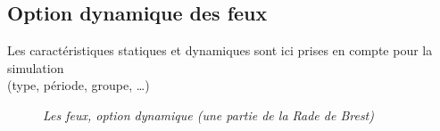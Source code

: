 \subsection{Option dynamique des feux}
Les caractéristiques statiques et dynamiques sont ici prises en compte pour la simulation\\
 (type, période, groupe, \ldots)
\begin{center}
\begin{figure}[ht]
\caption{\label{equiProj}\textit{Les feux, option dynamique (une partie de la Rade de Brest)}}
\end{figure}
\end{center}

